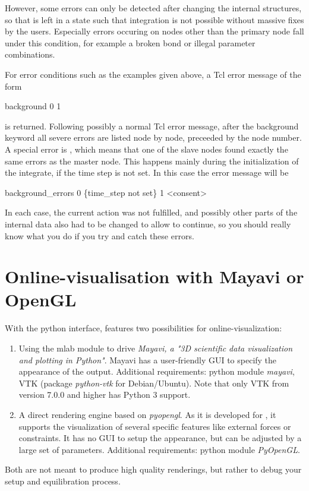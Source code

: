 However, some errors can only be detected after changing the internal
structures, so that \es is left in a state such that integration is
not possible without massive fixes by the users. Especially errors
occuring on nodes other than the primary node fall under this
condition, for example a broken bond or illegal parameter
combinations.

For error conditions such as the examples given above, a Tcl error
message of the form
\begin{code}
 background 0   1 
\end{code}
is returned. Following possibly a normal Tcl error message, after the
background keyword all severe errors are listed node by node,
preceeded by the node number. A special error is ,
which means that one of the slave nodes found exactly the same errors
as the master node. This happens mainly during the initialization of
the integrate, \eg if the time step is not set. In this case the error
message will be
\begin{code}
background\_errors 0 \{time\_step not set\} 1 <consent> 
\end{code}
In each case, the current action was not fulfilled, and possibly other
parts of the internal data also had to be changed to allow \es to
continue, so you should really know what you do if you try and catch
these errors.

\section{Online-visualisation with Mayavi or OpenGL}
\label{sec:visualizer}

With the python interface, \es features two possibilities for
online-visualization: 

\begin{enumerate}
\item Using the mlab module to drive \emph{Mayavi, a "3D scientific data
visualization and plotting in Python"}. Mayavi has a user-friendly GUI to
specify the appearance of the output. Additional requirements: python module
\emph{mayavi}, VTK (package \emph{python-vtk} for Debian/Ubuntu). Note that
only VTK from version 7.0.0 and higher has Python 3 support.
\item A direct rendering engine based on \emph{pyopengl}. As it is
developed for \es, it supports the visualization of several specific features
like external forces or constraints. It has no GUI to setup the appearance, but
can be adjusted by a large set of parameters. Additional requirements: python
module \emph{PyOpenGL}.  
\end{enumerate}
Both are not meant to produce high quality renderings, but rather to debug your
setup and equilibration process.

